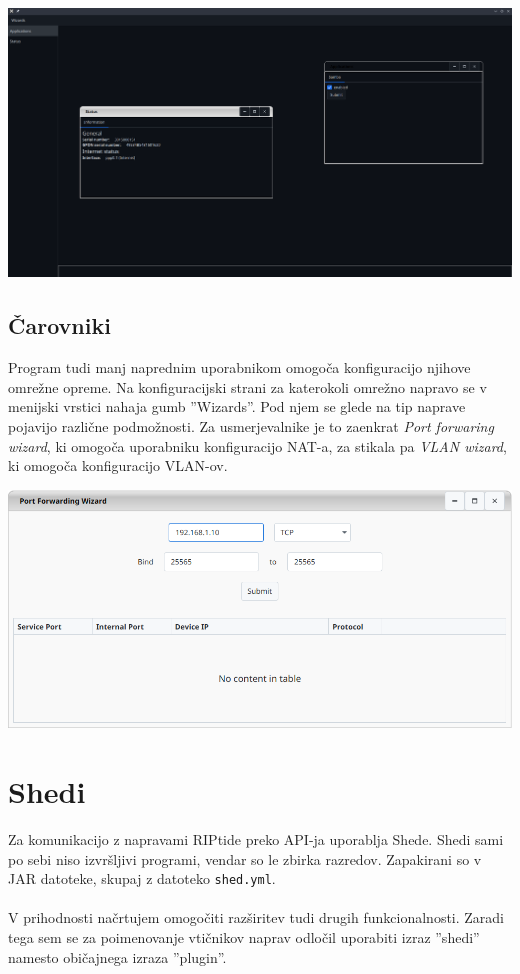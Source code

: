 \documentclass[12pt]{article}
\begin{document}
\begin{center}
	\includegraphics[scale=0.28]{slike/config-window.png}
\end{center}
\newpage

\subsection{Čarovniki}
Program tudi manj naprednim uporabnikom omogoča konfiguracijo njihove
omrežne opreme. Na konfiguracijski strani za katerokoli omrežno napravo
se v menijski vrstici nahaja gumb ''Wizards''. Pod njem se glede na tip
naprave pojavijo različne podmožnosti. Za usmerjevalnike je to zaenkrat
\textit{Port forwaring wizard}, ki omogoča uporabniku konfiguracijo NAT-a,
za stikala pa \textit{VLAN wizard}, ki omogoča konfiguracijo VLAN-ov.

\begin{center}
	\includegraphics[scale=0.56]{slike/pat-wizard.png}
\end{center}
\newpage

\section{Shedi}
Za komunikacijo z napravami RIPtide preko API-ja uporablja Shede. Shedi
sami po sebi niso izvršljivi programi, vendar so le zbirka razredov.
Zapakirani so v JAR datoteke, skupaj z datoteko \texttt{shed.yml}.
\\\\
V prihodnosti načrtujem omogočiti razširitev tudi drugih funkcionalnosti.
Zaradi tega sem se za poimenovanje vtičnikov naprav odločil uporabiti
izraz ''shedi'' namesto običajnega izraza ''plugin''.
\end{document}
